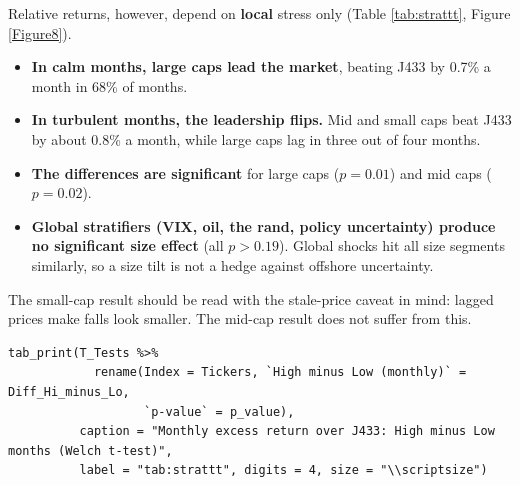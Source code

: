 \documentclass[11pt,preprint]{elsarticle}
\numberwithin{equation}{section}
\numberwithin{figure}{section}
\numberwithin{table}{section}
\def\tightlist{} %
\begin{document}
Relative returns, however, depend on \textbf{local} stress only (Table
\ref{tab:strattt}, Figure \ref{Figure8}).

\begin{itemize}
\tightlist
\item
  \textbf{In calm months, large caps lead the market}, beating J433 by
  0.7\% a month in 68\% of months.
\item
  \textbf{In turbulent months, the leadership flips.} Mid and small caps
  beat J433 by about 0.8\% a month, while large caps lag in three out of
  four months.
\item
  \textbf{The differences are significant} for large caps (\(p = 0.01\))
  and mid caps (\(p = 0.02\)).
\item
  \textbf{Global stratifiers (VIX, oil, the rand, policy uncertainty)
  produce no significant size effect} (all \(p > 0.19\)). Global shocks
  hit all size segments similarly, so a size tilt is not a hedge against
  offshore uncertainty.
\end{itemize}

The small-cap result should be read with the stale-price caveat in mind:
lagged prices make falls look smaller. The mid-cap result does not
suffer from this.

\begin{verbatim}
tab_print(T_Tests %>%
            rename(Index = Tickers, `High minus Low (monthly)` = Diff_Hi_minus_Lo,
                   `p-value` = p_value),
          caption = "Monthly excess return over J433: High minus Low months (Welch t-test)",
          label = "tab:strattt", digits = 4, size = "\\scriptsize")
\end{verbatim}
\end{document}

